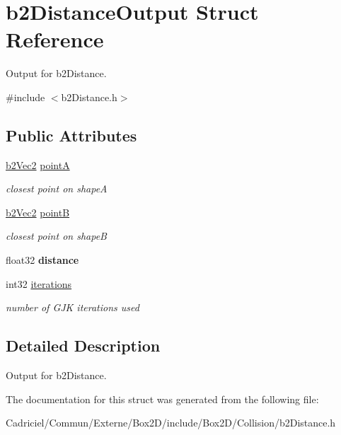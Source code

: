 \hypertarget{structb2_distance_output}{}\section{b2\+Distance\+Output Struct Reference}
\label{structb2_distance_output}


Output for b2\+Distance.  




{\ttfamily \#include $<$b2\+Distance.\+h$>$}

\subsection*{Public Attributes}
\begin{DoxyCompactItemize}
\item 
\hyperlink{structb2_vec2}{b2\+Vec2} \hyperlink{structb2_distance_output_a7e0f1f44a64e596dc7d37570c69eefce}{pointA}\hypertarget{structb2_distance_output_a7e0f1f44a64e596dc7d37570c69eefce}{}\label{structb2_distance_output_a7e0f1f44a64e596dc7d37570c69eefce}

\begin{DoxyCompactList}\small\item\em closest point on shapeA \end{DoxyCompactList}\item 
\hyperlink{structb2_vec2}{b2\+Vec2} \hyperlink{structb2_distance_output_aa85beca17337a506cd4a924d0c6f92cc}{pointB}\hypertarget{structb2_distance_output_aa85beca17337a506cd4a924d0c6f92cc}{}\label{structb2_distance_output_aa85beca17337a506cd4a924d0c6f92cc}

\begin{DoxyCompactList}\small\item\em closest point on shapeB \end{DoxyCompactList}\item 
float32 {\bfseries distance}\hypertarget{structb2_distance_output_ae67f480ff37d4ab732e6366f485c7f55}{}\label{structb2_distance_output_ae67f480ff37d4ab732e6366f485c7f55}

\item 
int32 \hyperlink{structb2_distance_output_ae2d4c84dd3d05ea4f4d20c91099ec8d5}{iterations}\hypertarget{structb2_distance_output_ae2d4c84dd3d05ea4f4d20c91099ec8d5}{}\label{structb2_distance_output_ae2d4c84dd3d05ea4f4d20c91099ec8d5}

\begin{DoxyCompactList}\small\item\em number of G\+JK iterations used \end{DoxyCompactList}\end{DoxyCompactItemize}


\subsection{Detailed Description}
Output for b2\+Distance. 

The documentation for this struct was generated from the following file\+:\begin{DoxyCompactItemize}
\item 
Cadriciel/\+Commun/\+Externe/\+Box2\+D/include/\+Box2\+D/\+Collision/b2\+Distance.\+h\end{DoxyCompactItemize}
